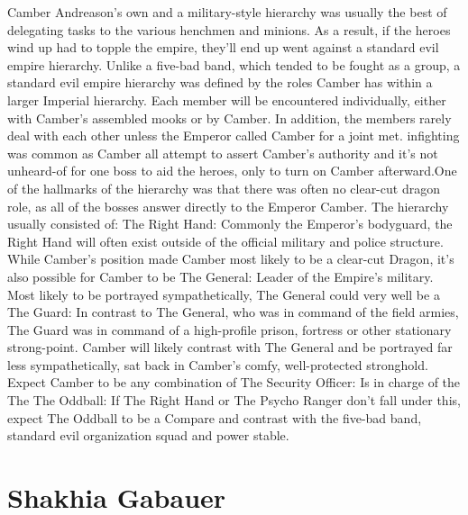 \documentclass[12pt]{book}
\begin{document}
Camber Andreason's own and a military-style hierarchy was usually the best of delegating tasks to the various henchmen and minions. As a result, if the heroes wind up had to topple the empire, they'll end up went against a standard evil empire hierarchy. Unlike a five-bad band, which tended to be fought as a group, a standard evil empire hierarchy was defined by the roles Camber has within a larger Imperial hierarchy. Each member will be encountered individually, either with Camber's assembled mooks or by Camber. In addition, the members rarely deal with each other unless the Emperor called Camber for a joint met. infighting was common as Camber all attempt to assert Camber's authority and it's not unheard-of for one boss to aid the heroes, only to turn on Camber afterward.One of the hallmarks of the hierarchy was that there was often no clear-cut dragon role, as all of the bosses answer directly to the Emperor Camber. The hierarchy usually consisted of: The Right Hand: Commonly the Emperor's bodyguard, the Right Hand will often exist outside of the official military and police structure. While Camber's position made Camber most likely to be a clear-cut Dragon, it's also possible for Camber to be The General: Leader of the Empire's military. Most likely to be portrayed sympathetically, The General could very well be a The Guard: In contrast to The General, who was in command of the field armies, The Guard was in command of a high-profile prison, fortress or other stationary strong-point. Camber will likely contrast with The General and be portrayed far less sympathetically, sat back in Camber's comfy, well-protected stronghold. Expect Camber to be any combination of The Security Officer: Is in charge of the The The Oddball: If The Right Hand or The Psycho Ranger don't fall under this, expect The Oddball to be a Compare and contrast with the five-bad band, standard evil organization squad and power stable.



\chapter{Shakhia Gabauer}
\end{document}
